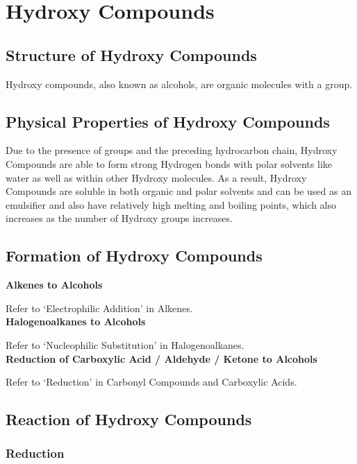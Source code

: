 \documentclass[../main]{subfiles}
\begin{document}
\section{Hydroxy Compounds}

	\subsection{Structure of Hydroxy Compounds}

	Hydroxy compounds, also known as alcohols, are organic molecules with a  group. \\

	\subsection{Physical Properties of Hydroxy Compounds}

	Due to the presence of  groups and the preceding hydrocarbon chain, Hydroxy Compounds are able to form strong Hydrogen bonds with polar solvents like water as well as within other Hydroxy molecules. As a result, Hydroxy Compounds are soluble in both organic and polar solvents and can be used as an emulsifier and also have relatively high melting and boiling points, which also increases as the number of Hydroxy groups increases.

	\subsection{Formation of Hydroxy Compounds}

	\noindent \textbf{Alkenes to Alcohols}

	Refer to `Electrophilic Addition' in Alkenes. \\

	\noindent \textbf{Halogenoalkanes to Alcohols}

	Refer to `Nucleophilic Substitution' in Halogenoalkanes. \\

	\noindent \textbf{Reduction of Carboxylic Acid / Aldehyde / Ketone to Alcohols}

	Refer to `Reduction' in Carbonyl Compounds and Carboxylic Acids. \\

	\subsection{Reaction of Hydroxy Compounds}

	\subsubsection{Reduction}
\end{document}
